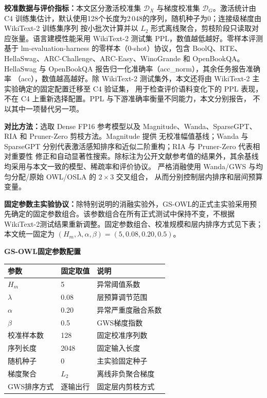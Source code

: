 \documentclass[UTF8,fontset=fandol]{ctexart}
\renewcommand{\arraystretch}{1.08}
\begin{document}
\textbf{校准数据与评价指标：}本文区分激活校准集 $\mathcal D_X$ 与梯度校准集 $\mathcal D_G$。激活统计由
C4\cite{c4} 训练集估计，默认使用128个长度为2\,048的序列，随机种子为0；连接级梯度由 WikiText-2 训练集序列
按小批次计算并以 $L_2$ 形式离线聚合，剪枝阶段只读取对应张量。语言建模性能采用
WikiText-2\cite{wikitext} 测试集 PPL，数值越低越好。零样本评测基于 lm-evaluation-harness 的零样本（0-shot）协议，包含
BoolQ\cite{boolq}、RTE\cite{glue}、HellaSwag\cite{hellaswag}、ARC-Challenge、ARC-Easy\cite{arc}、WinoGrande\cite{winogrande}
和 OpenBookQA\cite{openbookqa}。HellaSwag 与 OpenBookQA 报告归一化准确率（acc\_norm），其余任务报告准确率
（acc），数值越高越好。除 WikiText-2 测试集外，本文还将由 WikiText-2 主实验确定的固定配置迁移至 C4 验证集，
用于检查评价语料变化下的 PPL 表现，不在 C4 上重新选择配置。PPL 与下游准确率衡量不同能力，本文分别报告，
不以其中一项替代另一项。

\textbf{对比方法：}选取 Dense FP16 参考模型以及 Magnitude、Wanda、SparseGPT、RIA 和 Pruner-Zero 剪枝方法。Magnitude 提供
无校准幅值基线；Wanda 与 SparseGPT 分别代表激活感知排序和近似二阶重构；RIA 与 Pruner-Zero 代表相对重要性
修正和自动显著性搜索。除标注为公开文献参考值的结果外，其余基线均采用与本文一致的模型、稀疏率和评价协议。
严格消融使用 Wanda/GWS 与均匀分配/原始 OWL/OSLA 的 $2\times3$ 交叉组合，
从而分别控制层内排序和层间预算变量。

\textbf{固定参数主实验协议：}除特别说明的消融实验外，GS-OWL的正式主实验采用预先确定的固定参数组合。该参数组合在所有正式测试中保持不变，不根据WikiText-2测试结果重新调整。固定参数组合、校准规模和层内排序方式见下表；本文统一固定为 $(H_m,\lambda,\alpha,\beta)=(5,0.08,0.20,0.5)$。

\begin{table}[!htbp]
\centering
\textbf{GS-OWL固定参数配置}\par\vspace{2pt}
\scriptsize
\setlength{\tabcolsep}{5.0pt}
\renewcommand{\arraystretch}{1.02}
\begin{tabular}{lll}
\toprule
参数 & 固定取值 & 说明 \\
\midrule
$H_m$ & 5 & 异常阈值系数 \\
$\lambda$ & 0.08 & 层预算调节范围 \\
$\alpha$ & 0.20 & 异常严重度融合系数 \\
$\beta$ & 0.5 & GWS梯度指数 \\
校准样本数 & 128 & 固定校准序列数 \\
序列长度 & 2048 & 固定输入长度 \\
随机种子 & 0 & 主实验固定种子 \\
梯度聚合 & $L_2$ & 离线非负聚合梯度 \\
GWS排序方式 & 逐输出行 & 固定层内剪枝方式 \\
\bottomrule
\end{tabular}
\end{table}
\end{document}
